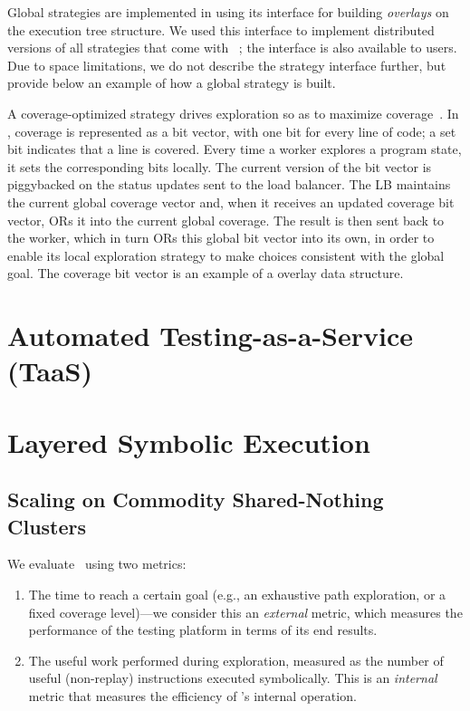 Global strategies are implemented in \cnine using its interface for building {\em overlays} on the execution tree structure.  We used this interface to implement distributed versions of all strategies that come with \klee~\cite{klee}; the interface is also available to \cnine users.  Due to space limitations, we do not describe the strategy interface further, but provide below an example of how a global strategy is built.

A coverage-optimized strategy drives exploration so as to maximize coverage~\cite{klee}.  In \cnine, coverage is represented as a bit vector, with one bit for every line of code; a set bit indicates that a line is covered.  Every time a worker explores a program state, it sets the corresponding bits locally. The current version of the bit vector is piggybacked on the status updates sent to the load balancer.  The LB maintains the current global coverage vector and, when it receives an updated coverage bit vector, {\small OR}s it into the current global coverage.  The result is then sent back to the worker, which in turn {\small OR}s this global bit vector into its own, in order to enable its local exploration strategy to make choices consistent with the global goal.  The coverage bit vector is an example of a \cnine overlay data structure.


\section{Automated Testing-as-a-Service (TaaS)}


\section{Layered Symbolic Execution}

\subsection{Scaling on Commodity Shared-Nothing Clusters}
\label{sec:scalability}

We evaluate \cnine\ using two metrics:
\begin{enumerate}
\item The time to reach a certain goal (e.g., an exhaustive path exploration, or a fixed coverage level)---we consider this an \emph{external} metric, which measures the performance of the testing platform in terms of its end results.
\item The useful work performed during exploration, measured as the number of useful (non-replay) instructions executed symbolically. This is an \emph{internal} metric that measures the efficiency of \cnine's internal operation. 
\end{enumerate}

